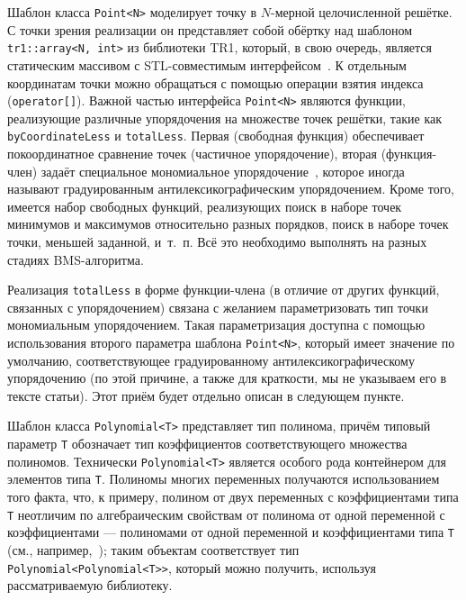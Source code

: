 \documentclass[14pt]{extarticle}
\newcommand{\nspace}{\hspace{0pt}}
\newcommand{\nbdash}{\nobreakdash-\nspace}
\begin{document}
Шаблон класса \lstinline$Point<N>$ моделирует точку в $N$\nbdash{}мерной
целочисленной решётке. С точки зрения реализации он представляет собой
обёртку над шаблоном \lstinline$tr1::array<N, int>$ из библиотеки TR1, который,
в свою очередь, является статическим массивом с STL\nbdash{}совместимым
интерфейсом~\cite[п.~6.2]{TR1}. К отдельным координатам точки можно
обращаться с помощью операции взятия индекса (\lstinline$operator[]$). Важной частью интерфейса
\lstinline$Point<N>$ являются функции, реализующие различные упорядочения на
множестве точек решётки, такие как \lstinline$byCoordinateLess$ и
\lstinline$totalLess$. Первая (свободная функция) обеспечивает покоординатное
сравнение точек (частичное упорядочение), вторая (функция-член) задаёт
специальное мономиальное упорядочение~\cite[с.~7]{CLO'S05}, которое иногда
называют градуированным антилексикографическим упорядочением. Кроме того,
имеется набор свободных функций, реализующих поиск в наборе точек минимумов и
максимумов относительно разных порядков, поиск в наборе точек точки, меньшей
заданной, и~т.~п. Всё это необходимо выполнять на разных стадиях
BMS\nbdash{}алгоритма. 

Реализация \lstinline$totalLess$ в форме функции-члена (в отличие от других
функций, связанных с упорядочением) связана с желанием параметризовать
тип точки мономиальным упорядочением. Такая параметризация доступна с помощью
использования второго параметра шаблона \lstinline$Point<N>$, который имеет
значение по умолчанию, соответствующее градуированному антилексикографическому
упорядочению (по этой причине, а также для краткости, мы не указываем его в
тексте статьи). Этот приём будет отдельно описан в следующем
пункте.

Шаблон класса \lstinline$Polynomial<T>$ представляет тип полинома, причём типовый
параметр \lstinline$T$ обозначает тип коэффициентов соответствующего множества
полиномов. Технически \lstinline$Polynomial<T>$ является особого рода контейнером
для элементов типа \lstinline$T$. Полиномы многих переменных получаются
использованием того факта, что, к примеру, полином от двух переменных с
коэффициентами типа \lstinline$T$ неотличим по алгебраическим свойствам от
полинома от одной переменной с коэффициентами — полиномами от одной переменной и
коэффициентами типа \lstinline$T$ (см., например,~\cite[гл.~IV, \S~1,
п.~5]{Bourbaki65}); таким объектам соответствует тип
\lstinline$Polynomial<Polynomial<T>>$, который можно получить, используя
рассматриваемую библиотеку. 
\end{document}
